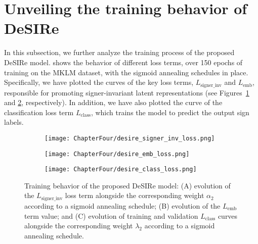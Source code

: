 \section{Unveiling the training behavior of DeSIRe}
\label{sec:desire_training_behav}
In this subsection, we further analyze the training process of the proposed DeSIRe model.  shows the behavior of different loss terms, over 150 epochs of training on the MKLM dataset, with the sigmoid annealing schedules in place. Specifically, we have plotted the curves of the key loss terms, $L_{\text{signer\_inv}}$ and $L_{\text{emb}}$, responsible for promoting signer-invariant latent representations (see Figures~\ref{fig:signer_inv_curve} and \ref{fig:emb_loss_curve}, respectively). In addition, we have also plotted the curve of the classification loss term $L_{\text{class}}$, which trains the model to predict the output sign labels.

\begin{figure}
    \centering
    \begin{subfigure}{0.325\textwidth}
        \centering
        \texttt{[image: ChapterFour/desire\_signer\_inv\_loss.png]}
        \caption{}
        \label{fig:signer_inv_curve}
    \end{subfigure}
    \hfill
    \begin{subfigure}{0.325\textwidth}
        \centering
        \texttt{[image: ChapterFour/desire\_emb\_loss.png]}
        \caption{}
        \label{fig:emb_loss_curve}
    \end{subfigure}
    \hfill
    \begin{subfigure}{0.325\textwidth}
        \centering
        \texttt{[image: ChapterFour/desire\_class\_loss.png]}
        \caption{}
        \label{fig:class_loss_curve}
    \end{subfigure}
    \caption{Training behavior of the proposed DeSIRe model: (A) evolution of the $L_{\text{signer\_inv}}$ loss term alongside the corresponding weight $\alpha_{2}$ according to a sigmoid annealing schedule; (B) evolution of the $L_{\text{emb}}$ term value; and (C) evolution of training and validation $L_{\text{class}}$ curves alongside the corresponding weight $\lambda_{2}$ according to a sigmoid annealing schedule.}
    \label{fig:desire_loss_curves}
\end{figure}

